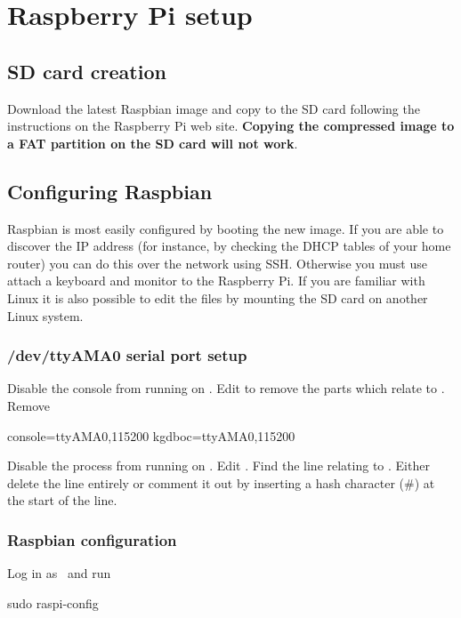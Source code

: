 \chapter{Raspberry Pi setup}

\section{SD card creation}

Download the latest Raspbian image and copy to the SD card following
the instructions on the Raspberry Pi web site. \textbf{Copying
  the compressed image to a FAT partition on the SD card will not work}.

\section{Configuring Raspbian}

Raspbian is most easily configured by booting the new image. If you
are able to discover the IP address (for instance, by checking the
DHCP tables of your home router) you can do this over the network
using SSH. Otherwise you must use attach a keyboard and monitor to the
Raspberry Pi. If you are familiar with Linux it is also possible to
edit the files by mounting the SD card on another Linux system.

\subsection{/dev/ttyAMA0 serial port setup}

Disable the console from running on . Edit
 to remove the parts which relate to
. Remove
\begin{Cmd}
console=ttyAMA0,115200 kgdboc=ttyAMA0,115200
\end{Cmd}


Disable the  process from running on
. Edit . Find the line
relating to . Either delete the line entirely or
comment it out by inserting a hash character (\#) at the start of the
line.

\subsection{Raspbian configuration}

Log in as \piUser\ and run
\begin{Cmd}
sudo raspi-config
\end{Cmd}

